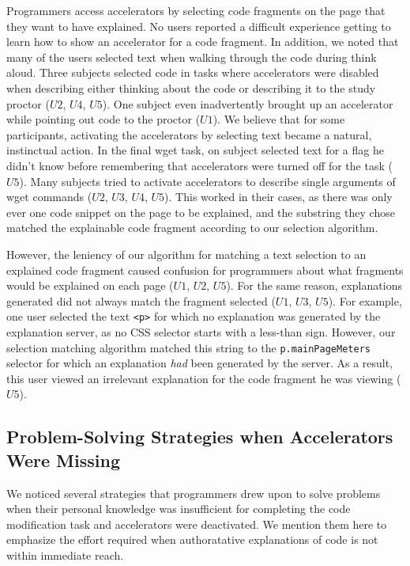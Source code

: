 Programmers access accelerators by selecting code fragments on the page that they want to have explained.
No users reported a difficult experience getting to learn how to show an accelerator for a code fragment.
In addition, we noted that many of the users selected text when walking through the code during think aloud.
Three subjects selected code in tasks where accelerators were disabled when describing either thinking about the code or describing it to the study proctor ($U2$, $U4$, $U5$).
One subject even inadvertently brought up an accelerator while pointing out code to the proctor ($U1$).
We believe that for some participants, activating the accelerators by selecting text became a natural, instinctual action.
In the final wget task, on subject selected text for a flag he didn't know before remembering that accelerators were turned off for the task ($U5$).
Many subjects tried to activate accelerators to describe single arguments of wget commands ($U2$, $U3$, $U4$, $U5$).
This worked in their cases, as there was only ever one code snippet on the page to be explained, and the substring they chose matched the explainable code fragment according to our selection algorithm.

However, the leniency of our algorithm for matching a text selection to an explained code fragment caused confusion for programmers about what fragments would be explained on each page ($U1$, $U2$, $U5$).
For the same reason, explanations generated did not always match the fragment selected ($U1$, $U3$, $U5$).
For example, one user selected the text \texttt{<p>} for which no explanation was generated by the explanation server, as no CSS selector starts with a less-than sign.
However, our selection matching algorithm matched this string to the \texttt{p.mainPageMeters} selector for which an explanation \emph{had} been generated by the server.
As a result, this user viewed an irrelevant explanation for the code fragment he was viewing ($U5$).

\subsection{Problem-Solving Strategies when Accelerators Were Missing}

We noticed several strategies that programmers drew upon to solve problems when their personal knowledge was insufficient for completing the code modification task and accelerators were deactivated.
We mention them here to emphasize the effort required when authoratative explanations of code is not within immediate reach.

